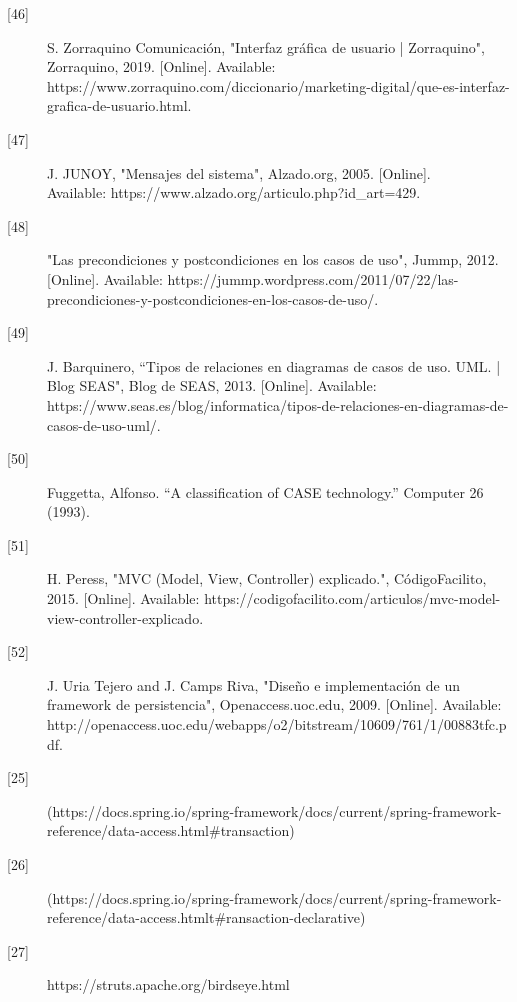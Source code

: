 \begin{description}
		\item[\hypertarget{b46}{[46]}] S. Zorraquino Comunicación, "Interfaz gráfica de usuario | Zorraquino", Zorraquino, 2019. [Online]. Available: https://www.zorraquino.com/diccionario/marketing-digital/que-es-interfaz-grafica-de-usuario.html.
		
		\item[\hypertarget{b47}{[47]}]J. JUNOY, "Mensajes del sistema", Alzado.org, 2005. [Online]. \\ Available: https://www.alzado.org/articulo.php?id\_art=429.
		
		\item[\hypertarget{b48}{[48]}]"Las precondiciones y postcondiciones en los casos de uso", Jummp, 2012. [Online]. Available: https://jummp.wordpress.com/2011/07/22/las-precondiciones-y-postcondiciones-en-los-casos-de-uso/.
		
		\item[\hypertarget{b49}{[49]}]J. Barquinero, “Tipos de relaciones en diagramas de casos de uso. UML. | Blog SEAS", Blog de SEAS, 2013. [Online]. Available: https://www.seas.es/blog/informatica/tipos-de-relaciones-en-diagramas-de-casos-de-uso-uml/. 
		
		\item[\hypertarget{b50}{[50]}] Fuggetta, Alfonso. “A classification of CASE technology.” Computer 26 (1993).
		
		\item[\hypertarget{b51}{[51]}] H. Peress, "MVC (Model, View, Controller) explicado.", CódigoFacilito, 2015. [Online]. Available: https://codigofacilito.com/articulos/mvc-model-view-controller-explicado. \\
		
		\item[\hypertarget{b52}{[52]}] J. Uria Tejero and J. Camps Riva, "Diseño e implementación de un framework de persistencia", Openaccess.uoc.edu, 2009. [Online]. Available: http://openaccess.uoc.edu/webapps/o2/bitstream/10609/761/1/00883tfc.pdf.
		
		\item[\hypertarget{b25}{[25]}] (https://docs.spring.io/spring-framework/docs/current/spring-framework-reference/data-access.html\#transaction)
		
		\item[\hypertarget{b26}{[26]}] (https://docs.spring.io/spring-framework/docs/current/spring-framework-reference/data-access.htmlt\#ransaction-declarative)
		
		\item[\hypertarget{b27}{[27]}] https://struts.apache.org/birdseye.html 
		

\end{description}
